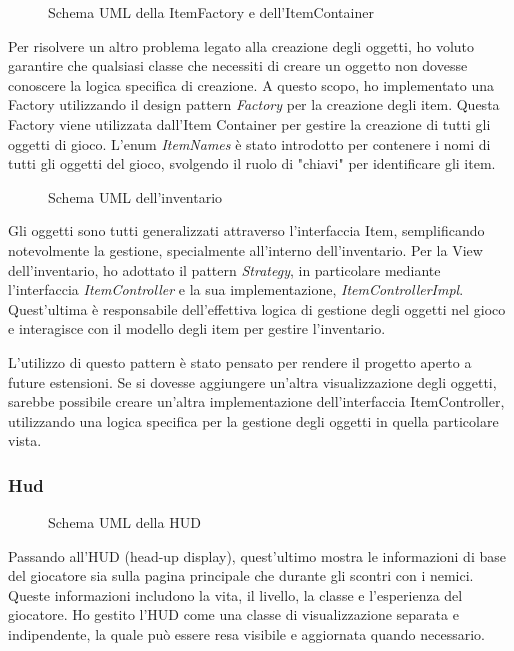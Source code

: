 \documentclass[a4paper,12pt]{report}
\begin{document}
\begin{figure}[H]
	\centering
	
	\caption{Schema UML della ItemFactory e dell'ItemContainer}
	\label{fig:the-exiled-itemFactory_itemContainer-uml}
\end{figure}

Per risolvere un altro problema legato alla creazione degli oggetti, ho voluto garantire che qualsiasi classe che necessiti di creare un oggetto non dovesse conoscere la logica specifica di creazione. A questo scopo, ho implementato una Factory utilizzando il design pattern \textit{Factory} per la creazione degli item. Questa Factory viene utilizzata dall'Item Container per gestire la creazione di tutti gli oggetti di gioco. L'enum \textit{ItemNames} è stato introdotto per contenere i nomi di tutti gli oggetti del gioco, svolgendo il ruolo di "chiavi" per identificare gli item.

\begin{figure}[H]
	\centering
	
	\caption{Schema UML dell'inventario}
	\label{fig:the-exiled-inventory-uml}
\end{figure}

Gli oggetti sono tutti generalizzati attraverso l'interfaccia Item, semplificando notevolmente la gestione, specialmente all'interno dell'inventario. Per la View dell'inventario, ho adottato il pattern \textit{Strategy}, in particolare mediante l'interfaccia \textit{ItemController} e la sua implementazione, \textit{ItemControllerImpl}. Quest'ultima è responsabile dell'effettiva logica di gestione degli oggetti nel gioco e interagisce con il modello degli item per gestire l'inventario.

L'utilizzo di questo pattern è stato pensato per rendere il progetto aperto a future estensioni. Se si dovesse aggiungere un'altra visualizzazione degli oggetti, sarebbe possibile creare un'altra implementazione dell'interfaccia ItemController, utilizzando una logica specifica per la gestione degli oggetti in quella particolare vista.
\subsubsection{Hud}
\begin{figure}[H]
	\centering
	
	\caption{Schema UML della HUD}
	\label{fig:the-exiled-hud-uml}
\end{figure}

Passando all'HUD (head-up display), quest'ultimo mostra le informazioni di base del giocatore sia sulla pagina principale che durante gli scontri con i nemici. Queste informazioni includono la vita, il livello, la classe e l'esperienza del giocatore. Ho gestito l'HUD come una classe di visualizzazione separata e indipendente, la quale può essere resa visibile e aggiornata quando necessario.
\end{document}
